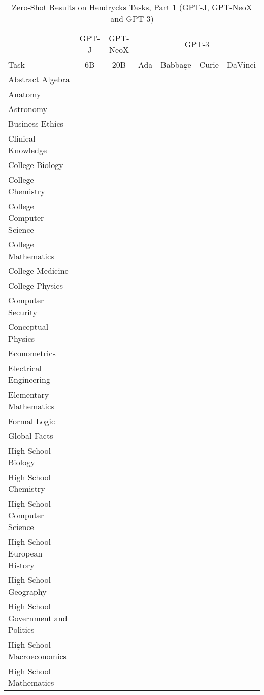 \documentclass[11pt]{article}
\begin{document}
{\onecolumn
\begin{landscape}
\begin{table*}    
\centering \begin{tabular}{l c c c c c c }
 & GPT-J & GPT-NeoX & \multicolumn{4}{c}{GPT-3} \\
Task & 6B & 20B & Ada & Babbage & Curie & DaVinci\\ \toprule
Abstract Algebra &  &  &  &  &  &  \\ 
Anatomy &  &  &  &  &  &  \\ 
Astronomy &  &  &  &  &  &  \\ 
Business Ethics &  &  &  &  &  &  \\ 
Clinical Knowledge &  &  &  &  &  &  \\ 
College Biology &  &  &  &  &  &  \\ 
College Chemistry &  &  &  &  &  &  \\ 
College Computer Science &  &  &  &  &  &  \\ 
College Mathematics &  &  &  &  &  &  \\ 
College Medicine &  &  &  &  &  &  \\ 
College Physics &  &  &  &  &  &  \\ 
Computer Security &  &  &  &  &  &  \\ 
Conceptual Physics &  &  &  &  &  &  \\ 
Econometrics &  &  &  &  &  &  \\ 
Electrical Engineering &  &  &  &  &  &  \\ 
Elementary Mathematics &  &  &  &  &  &  \\ 
Formal Logic &  &  &  &  &  &  \\ 
Global Facts &  &  &  &  &  &  \\ 
High School Biology &  &  &  &  &  &  \\ 
High School Chemistry &  &  &  &  &  &  \\ 
High School Computer Science &  &  &  &  &  &  \\ 
High School European History &  &  &  &  &  &  \\ 
High School Geography &  &  &  &  &  &  \\ 
High School Government and Politics &  &  &  &  &  &  \\ 
High School Macroeconomics &  &  &  &  &  &  \\
High School Mathematics &  &  &  &  &  &  \\ 
\bottomrule\end{tabular}
\caption{Zero-Shot Results on Hendrycks Tasks, Part 1 (GPT-J, GPT-NeoX and GPT-3)}
\label{tab:hendrycks-gpt1}
\end{table*}


\end{landscape}}
\end{document}
